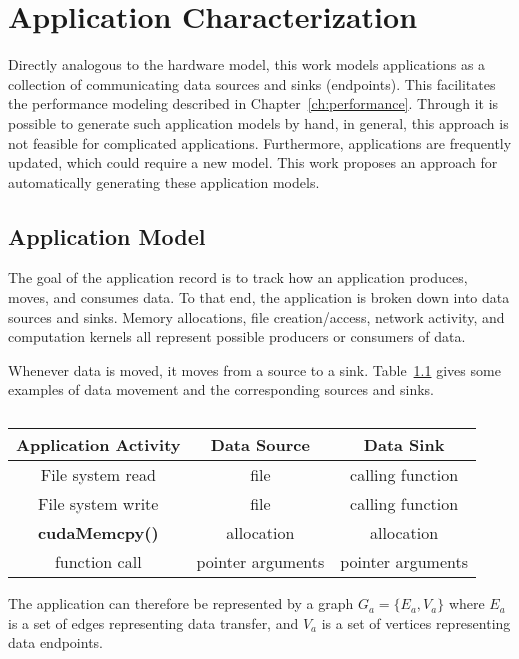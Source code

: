 \chapter{Application Characterization}


Directly analogous to the hardware model, this work models applications as a collection of communicating data sources and sinks (endpoints).
This facilitates the performance modeling described in Chapter~\ref{ch:performance}.
Through it is possible to generate such application models by hand, in general, this approach is not feasible for complicated applications.
Furthermore, applications are frequently updated, which could require a new model.
This work proposes an approach for automatically generating these application models.

\section{Application Model}

The goal of the application record is to track how an application produces, moves, and consumes data.
To that end, the application is broken down into data sources and sinks.
Memory allocations, file creation/access, network activity, and computation kernels all represent possible producers or consumers of data.

Whenever data is moved, it moves from a source to a sink.
Table~\ref{tab:source-sink-example} gives some examples of data movement and the corresponding sources and sinks.

\begin{table}[h]
    \centering
    \caption{}
    \label{tab:source-sink-example}
    \begin{tabular}{|c|c|c|}
    \hline
    \textbf{Application Activity} & \textbf{Data Source} & \textbf{Data Sink} \\ \hline
    File system read  & file & calling function \\ \hline
    File system write  & file & calling function \\ \hline
    \textbf{cudaMemcpy()} & allocation & allocation \\ \hline
    function call & pointer arguments & pointer arguments \\ \hline
    \end{tabular}
\end{table}

The application can therefore be represented by a graph $G_a = \{E_a,V_a\}$ where $E_a$ is a set of edges representing data transfer, and $V_a$ is a set of vertices representing data endpoints.

